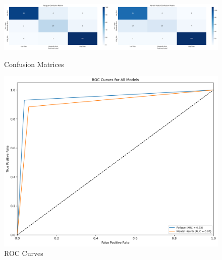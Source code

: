 \begin{figure}[httpb] %
    \centering
    \begin{minipage}{0.45\textwidth}
        \centering
        \includegraphics[width=\textwidth]{../images/qr_confusion_matrices.png} %
        \caption{Confusion Matrices}
        \label{fig:qr_confusion_matrices}
    \end{minipage}
    \hfill
    \begin{minipage}{0.45\textwidth}
        \centering
        \includegraphics[width=\textwidth]{../images/qr_roc_curves.png} %
        \caption{ROC Curves}
        \label{fig:qr_roc_curves}
    \end{minipage}
\end{figure}


